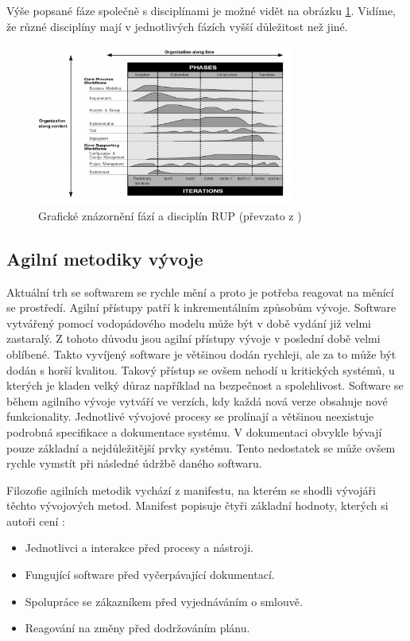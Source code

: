 \documentclass[czech,master,public,dept460,male,cpdeclaration,oneside]{diploma}
\begin{document}
Výše popsané fáze společně s disciplínami je možné vidět na obrázku \ref{fig:rup}. Vidíme, že různé disciplíny mají v jednotlivých fázích vyšší důležitost než jiné.

\begin{figure}[!ht]
    \centering
    \includegraphics[width=0.75\textwidth]{Diplomka/Figures/rup.png}
    \caption{Grafické znázornění fází a disciplín RUP (převzato z \cite{ref:rup_ibm})}
    \label{fig:rup}
\end{figure}

\subsection{Agilní metodiky vývoje}
Aktuální trh se softwarem se rychle mění a proto je potřeba reagovat na měnící se prostředí. Agilní přístupy patří k inkrementálním způsobům vývoje. Software vytvářený pomocí vodopádového modelu může být v době vydání již velmi zastaralý. Z tohoto důvodu jsou agilní přístupy vývoje v poslední době velmi oblíbené. Takto vyvíjený software je většinou dodán rychleji, ale za to může být dodán s horší kvalitou. Takový přístup se ovšem nehodí u kritických systémů, u kterých je kladen velký důraz například na bezpečnost a spolehlivost. Software se během agilního vývoje vytváří ve verzích, kdy každá nová verze obsahuje nové funkcionality. Jednotlivé vývojové procesy se prolínají a většinou neexistuje podrobná specifikace a dokumentace systému. V dokumentaci obvykle bývají pouze základní a nejdůležitější prvky systému. Tento nedostatek se může ovšem rychle vymstít při následné údržbě daného softwaru.

Filozofie agilních metodik vychází z manifestu, na kterém se shodli vývojáři těchto vývojových metod. Manifest popisuje čtyři základní hodnoty, kterých si autoři cení \cite{ref:agilne_manifesto}:

\begin{itemize}
\item Jednotlivci a interakce před procesy a nástroji.
\item Fungující software před vyčerpávající dokumentací.
\item Spolupráce se zákazníkem před vyjednáváním o smlouvě.
\item Reagování na změny před dodržováním plánu.
\end{itemize}
\end{document}
